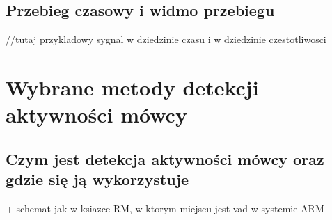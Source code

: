 \documentclass[eng,printmode]{mgr}
\begin{document}
 \section{Przebieg czasowy i widmo przebiegu}
 //tutaj przykladowy sygnal w dziedzinie czasu i w dziedzinie czestotliwosci 
 
 
  

\chapter{Wybrane metody detekcji aktywności mówcy}
 \section{Czym jest detekcja aktywności mówcy oraz gdzie się ją wykorzystuje}
 + schemat jak w ksiazce RM, w ktorym miejscu jest vad w systemie ARM
 
\end{document}
